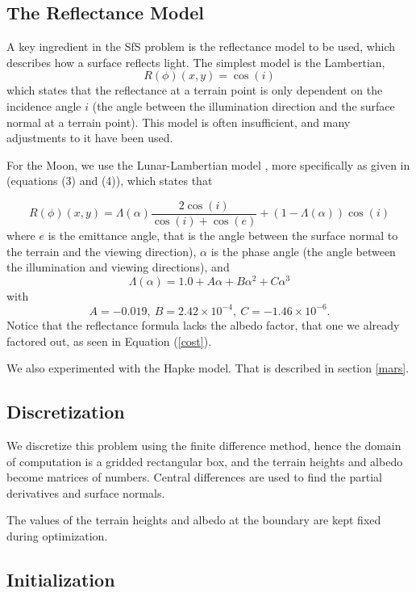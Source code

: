 \documentclass[12pt,oneside]{article}
\begin{document}
\subsection{The Reflectance Model}
\label{reflectance}

A key ingredient in the SfS problem is the reflectance model to be used, which describes
how a surface reflects light. The simplest model is the Lambertian,
$$
R(\phi)(x, y) = \cos(i)
$$
which states that the reflectance at a terrain point is only dependent
on the incidence angle $i$ (the angle between the illumination
direction and the surface normal at a terrain point). This model is
often insufficient, and many adjustments to it have been used.

For the Moon, we use the Lunar-Lambertian model
\citet{mcewen1991photometric}, more specifically as given in
\cite{lohse2006derivation} (equations (3) and (4)), which states that

$$
R(\phi)(x, y) = \Lambda(\alpha) \frac{2\cos (i)}{\cos(i) + \cos(e)}
 + \left(1-\Lambda(\alpha)\right) \cos(i)
$$
where $e$ is the emittance angle, that is the angle between the surface
normal to the terrain and the viewing direction), $\alpha$ is the phase
angle (the angle between the illumination and viewing directions), and
$$
\Lambda(\alpha) = 1.0 + A\alpha + B\alpha^2 + C\alpha^3
$$
with
$$
A = -0.019, \  B = 2.42\times 10^{-4}, \  C = -1.46 \times 10^{-6}.
$$
Notice that the reflectance formula lacks the albedo factor, that one we
already factored out, as seen in Equation (\ref{cost}).

We also experimented with the Hapke model. That is described in section 
\ref{mars}.

\subsection{Discretization}

We discretize this problem using the finite difference method, hence the
domain of computation is a gridded rectangular box, and the terrain heights and
albedo become matrices of numbers. Central differences are used to find
the partial derivatives and surface normals.

The values of the terrain heights and albedo at the boundary are 
kept fixed during optimization.

\subsection{Initialization}
\end{document}

